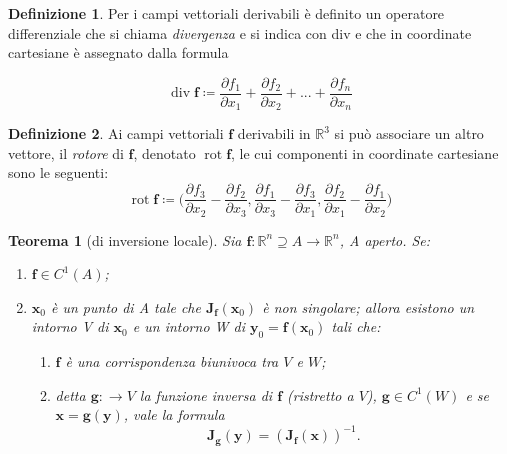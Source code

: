 \documentclass[a4paper]{book}
\DeclareMathOperator{\rot}{rot}
\DeclareMathOperator{\divg}{div}
\numberwithin{equation}{section}
\theoremstyle{plain}
\newtheorem{teor}{Teorema}[section]
\theoremstyle{definition}
\newtheorem{defn}{Definizione}[section]
\theoremstyle{remark}
\renewcommand{\vec}{\boldsymbol}
\theoremstyle{example}
\begin{document}
\begin{defn}
	Per i campi vettoriali derivabili è definito un operatore differenziale che si chiama \textit{divergenza} e si indica con div e che in coordinate cartesiane è assegnato dalla formula

	\begin{equation}
		\divg \vec{f} \coloneqq \frac{\partial{f_1}}{\partial{x_1}} + \frac{\partial{f_2}}{\partial{x_2}}+ ... + \frac{\partial{f_n}}{\partial{x_n}}
	\end{equation}
\end{defn}
\begin{defn}
	Ai campi vettoriali $\vec{f}$ derivabili in $\mathbb{R}^3$ si può associare un altro vettore, il \textit{rotore} di $\vec{f}$, denotato $\rot \vec{f}$, le  cui componenti in coordinate cartesiane sono le seguenti:
	\begin{equation}
		\rot \vec{f} \coloneqq \Biggl(\frac{\partial{f_3}}{\partial{x_2}}-\frac{\partial{f_2}}{\partial{x_3}},\frac{\partial{f_1}}{\partial{x_3}}-\frac{\partial{f_3}}{\partial{x_1}},\frac{\partial{f_2}}{\partial{x_1}}-\frac{\partial{f_1}}{\partial{x_2}} \Biggr)
	\end{equation}
\end{defn}

\begin{teor}[di inversione locale]
	Sia $\vec{f}\colon\mathbb{R}^n \supseteq  A \rightarrow  \mathbb{R}^n$, A aperto. Se:
	\begin{enumerate}
		\item $\vec{f} \in C^1(A)$;
		\item $\vec{x}_0$ è un punto di A tale che $\vec{J}_{\vec{f}}(\vec{x}_0)$ è non singolare;
		allora esistono un intorno V di $\vec{x}_0$ e un intorno W di $\vec{y}_0 = \vec{f}(\vec{x}_0)$ tali che:
		\begin{enumerate}
			\item $\vec{f}$ è una corrispondenza biunivoca tra $V$ e $W$;
			\item detta $\vec{g}:\rightarrow V$ la funzione inversa di $\vec{f}$ (ristretto a $V$), $\vec{g} \in C^1(W)$ e se $\vec{x} = \vec{g}(\vec{y})$, vale la formula
			\begin{equation}
				\vec{J}_{\vec{g}}(\vec{y}) = (\vec{J}_{\vec{f}}(\vec{x}))^{-1}.
			\end{equation}
		\end{enumerate}
	\end{enumerate}
\end{teor}
\end{document}
